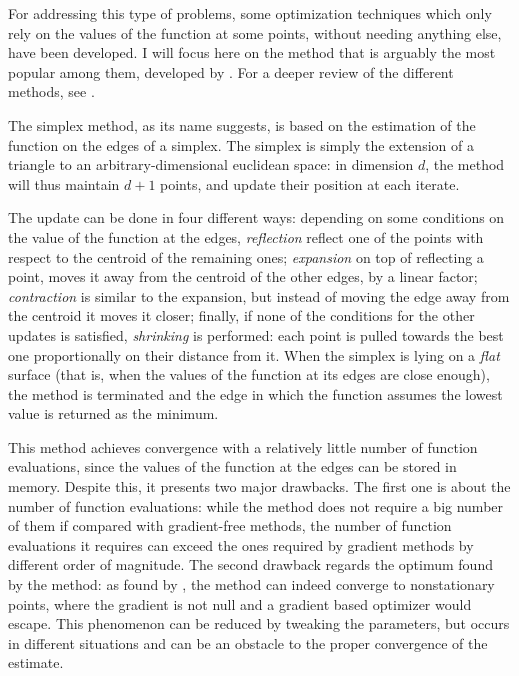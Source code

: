 For addressing this type of problems, some optimization techniques which only rely on the values of the function at some points,
without needing anything else,
have been developed.
I will focus here on the method that is arguably the most popular among them,
developed by \textcite{10.1093/comjnl/7.4.308}.
For a deeper review of the different methods, see \cite{10.5555/1508119}.

The simplex method, as its name suggests, is based on the estimation of the function on the edges of a simplex.
The simplex is simply the extension of a triangle to an arbitrary-dimensional euclidean space:
in dimension \(d\), the method will thus maintain \(d+1\) points,
and update their position at each iterate.

The update can be done in four different ways:
depending on some conditions on the value of the function at the edges,
\textit{reflection} reflect one of the points with respect to the centroid of the remaining ones;
\textit{expansion} on top of reflecting a point, moves it away from the centroid of the other edges, by a linear factor;
\textit{contraction} is similar to the expansion, but instead of moving the edge away from the centroid it moves it closer;
finally, if none of the conditions for the other updates is satisfied,
\textit{shrinking} is performed:
each point is pulled towards the best one proportionally on their distance from it.
When the simplex is lying on a \textit{flat} surface (that is, when the values of the function at its edges are close enough),
the method is terminated and the edge in which the function assumes the lowest value is returned as the minimum.

This method achieves convergence with a relatively little number of function evaluations,
since the values of the function at the edges can be stored in memory.
Despite this, it presents two major drawbacks.
The first one is about the number of function evaluations:
while the method does not require a big number of them if compared with gradient-free methods,
the number of function evaluations it requires can exceed the ones required by gradient methods by different order of magnitude.
The second drawback regards the optimum found by the method:
as found by \textcite{doi:10.1137/S1052623496303482},
the method can indeed converge to nonstationary points,
where the gradient is not null and a gradient based optimizer would escape.
This phenomenon can be reduced by tweaking the parameters,
but occurs in different situations and can be an obstacle to the proper convergence of the estimate.

